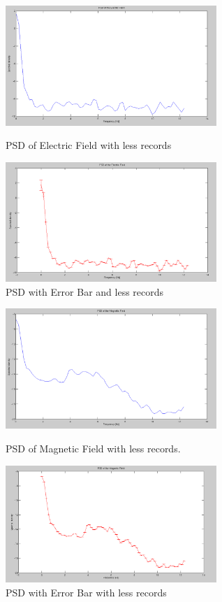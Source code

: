 \documentclass{article}
\begin{document}
\begin{figure}[htb!]
\begin{minipage}[c]{0.5\linewidth}
\centering
\includegraphics[width=8cm]{Figures/PSD_electric_L.png}
\caption{PSD of Electric Field with less records}
\label{fig:PSD_electric_L}
\end{minipage}
\hspace{0.1cm}
\begin{minipage}[c]{0.5\linewidth}
\centering
\includegraphics[width=8cm]{Figures/PSD_electric_errorL.png}
\caption{PSD with Error Bar and less records}
\label{fig:PSD_electric_errorL}
\end{minipage}
\end{figure}

\begin{figure}[htb!]
\begin{minipage}[c]{0.5\linewidth}
\centering
\includegraphics[width=8cm]{Figures/PSD_magnetic_L.png}
\caption{PSD of Magnetic Field with less records.}
\label{fig:PSD_magnetic_L}
\end{minipage}
\hspace{0.1cm}
\begin{minipage}[c]{0.5\linewidth}
\centering
\includegraphics[width=8cm]{Figures/PSD_magnetic_errorL.png}
\caption{PSD with Error Bar with less records}
\label{fig:PSD_magnetic_errorL}
\end{minipage}
\end{figure}
\end{document}
